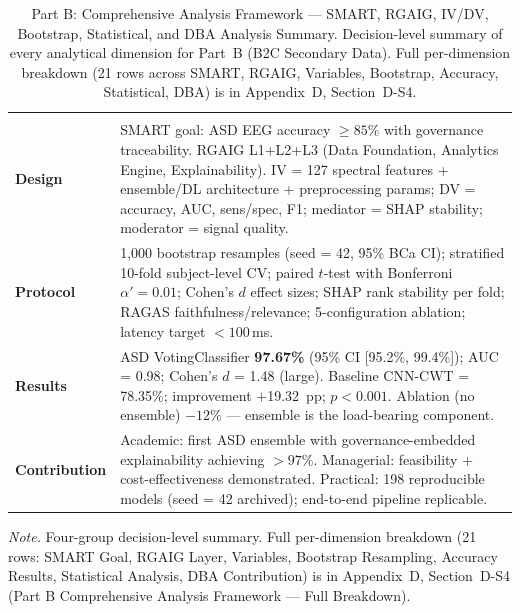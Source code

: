 {\tablestripes\tablefontsize
\begin{xltabular}{\textwidth}{@{} >{\raggedright\arraybackslash}p{2.5cm} L @{}}
\caption[Part B: Comprehensive Analysis Framework --- SMART,]{Part B: Comprehensive Analysis Framework --- SMART, RGAIG, IV/DV, Bootstrap, Statistical, and DBA Analysis Summary. Decision-level summary of every analytical dimension for Part~B (B2C Secondary Data). Full per-dimension breakdown (21 rows across SMART, RGAIG, Variables, Bootstrap, Accuracy, Statistical, DBA) is in Appendix~D, Section~D-S4.}\label{tab:ch4_partb_comprehensive} \\
\toprule
{} &  \\
\midrule
\endfirsthead
\toprule
{} &  \\
\midrule
\endhead
\bottomrule
\endlastfoot
\textbf{Design} & SMART goal: ASD EEG accuracy $\geq 85\%$ with governance traceability. RGAIG L1+L2+L3 (Data Foundation, Analytics Engine, Explainability). IV = 127 spectral features + ensemble/DL architecture + preprocessing params; DV = accuracy, AUC, sens/spec, F1; mediator = SHAP stability; moderator = signal quality. \\
\addlinespace
\textbf{Protocol} & 1,000 bootstrap resamples (seed = 42, 95\% BCa CI); stratified 10-fold subject-level CV; paired $t$-test with Bonferroni $\alpha' = 0.01$; Cohen's $d$ effect sizes; SHAP rank stability per fold; RAGAS faithfulness/relevance; 5-configuration ablation; latency target $< 100$\,ms. \\
\addlinespace
\textbf{Results} & ASD VotingClassifier \textbf{97.67\%} (95\% CI [95.2\%, 99.4\%]); AUC = 0.98; Cohen's $d$ = 1.48 (large). Baseline CNN-CWT = 78.35\%; improvement $+$19.32~pp; $p < 0.001$. Ablation (no ensemble) $-12\%$ --- ensemble is the load-bearing component. \\
\addlinespace
\textbf{Contribution} & Academic: first ASD ensemble with governance-embedded explainability achieving $> 97\%$. Managerial: feasibility + cost-effectiveness demonstrated. Practical: 198 reproducible models (seed = 42 archived); end-to-end pipeline replicable. \\
\end{xltabular}}
\vspace{0.4em}
\noindent\textit{Note.} Four-group decision-level summary. Full per-dimension breakdown (21 rows: SMART Goal, RGAIG Layer, Variables, Bootstrap Resampling, Accuracy Results, Statistical Analysis, DBA Contribution) is in Appendix~D, Section~D-S4 (Part B Comprehensive Analysis Framework --- Full Breakdown).

